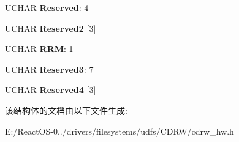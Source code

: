 \begin{DoxyCompactItemize}
U\+C\+H\+AR {\bfseries Reserved}\+: 4
\item 
\mbox{\label{struct___f_o_r_m_a_t_t_a_b_l_e___d_e_s_c_r_i_p_t_o_r_a3ce36d861e5dbfd2502bb864c5e1d6e4}} 
U\+C\+H\+AR {\bfseries Reserved2} \mbox{[}3\mbox{]}
\item 
\mbox{\label{struct___f_o_r_m_a_t_t_a_b_l_e___d_e_s_c_r_i_p_t_o_r_ae21ec695f355e275ab26df8b0955b3ec}} 
U\+C\+H\+AR {\bfseries R\+RM}\+: 1
\item 
\mbox{\label{struct___f_o_r_m_a_t_t_a_b_l_e___d_e_s_c_r_i_p_t_o_r_a361ae45e38044cb2dc57b0e96bd0a66f}} 
U\+C\+H\+AR {\bfseries Reserved3}\+: 7
\item 
\mbox{\label{struct___f_o_r_m_a_t_t_a_b_l_e___d_e_s_c_r_i_p_t_o_r_a5bbac5d2a5895c7b4e8ea578d1e19410}} 
U\+C\+H\+AR {\bfseries Reserved4} \mbox{[}3\mbox{]}
\end{DoxyCompactItemize}


该结构体的文档由以下文件生成\+:\begin{DoxyCompactItemize}
\item 
E\+:/\+React\+O\+S-\/0../drivers/filesystems/udfs/\+C\+D\+R\+W/cdrw\+\_\+hw.\+h\end{DoxyCompactItemize}
